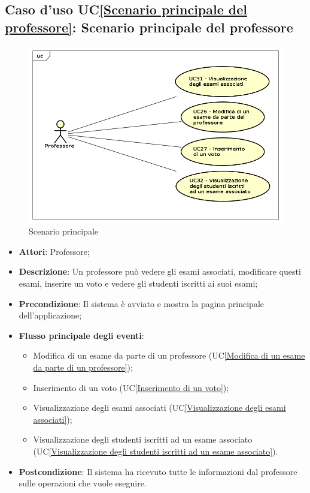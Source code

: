\subsection{Caso d'uso UC\ref{Scenario principale del professore}: Scenario principale del professore}
\begin{figure} [H]
	\centering
	\includegraphics[scale=0.4]{./img/UseCaseDiagram03.png}
	\caption{Scenario principale }\label{}
\end{figure}
\begin{itemize}
	\item \textbf{Attori}: Professore;
	\item \textbf{Descrizione}: Un professore può vedere gli esami associati, modificare questi esami, inserire un voto e vedere gli studenti iscritti ai suoi esami;
	\item \textbf{Precondizione}: Il sistema è avviato e mostra la pagina principale dell'applicazione;
	\item \textbf{Flusso principale degli eventi}: 
	\begin{itemize}
		\item Modifica di un esame da parte di un professore
		(UC\ref{Modifica di un esame da parte di un professore});
		\item Inserimento di un voto
		(UC\ref{Inserimento di un voto});
		\item Visualizzazione degli esami associati
		(UC\ref{Visualizzazione degli esami associati});
		\item Visualizzazione degli studenti iscritti ad un esame associato
		(UC\ref{Visualizzazione degli studenti iscritti ad un esame associato}).
	\end{itemize}
	\item \textbf{Postcondizione}: Il sistema ha ricevuto tutte le informazioni dal professore sulle operazioni che vuole eseguire.
\end{itemize}

